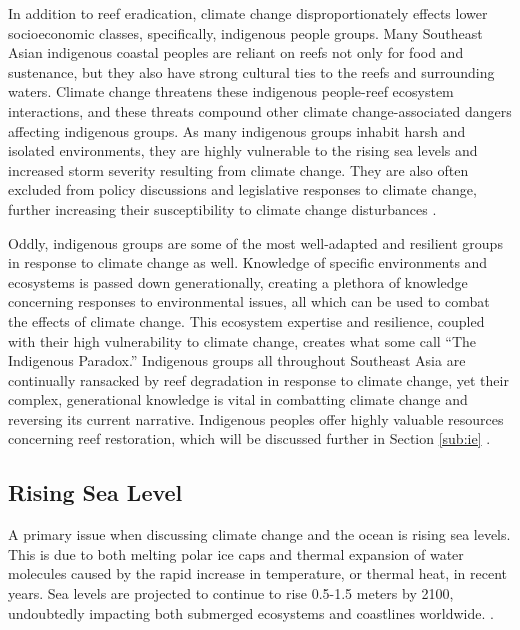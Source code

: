 \documentclass{book}\usepackage{knitr}
\begin{document}
In addition to reef eradication, climate change disproportionately effects lower socioeconomic classes, specifically, indigenous people groups. Many Southeast Asian indigenous coastal peoples are reliant on reefs not only for food and sustenance, but they also have strong cultural ties to the reefs and surrounding waters. Climate change threatens these indigenous people-reef ecosystem interactions, and these threats compound other climate change-associated dangers affecting indigenous groups. As many indigenous groups inhabit harsh and isolated environments, they are highly vulnerable to the rising sea levels and increased storm severity resulting from climate change. They are also often excluded from policy discussions and legislative responses to climate change, further increasing their susceptibility to climate change disturbances \citep{13772149520190801}.

	Oddly, indigenous groups are some of the most well-adapted and resilient groups in response to climate change as well. Knowledge of specific environments and ecosystems is passed down generationally, creating a plethora of knowledge concerning responses to environmental issues, all which can be used to combat the effects of climate change. This ecosystem expertise and resilience, coupled with their high vulnerability to climate change, creates what some call ``The Indigenous Paradox.'' Indigenous groups all throughout Southeast Asia are continually ransacked by reef degradation in response to climate change, yet their complex, generational knowledge is vital in combatting climate change and reversing its current narrative. Indigenous peoples offer highly valuable resources concerning reef restoration, which will be discussed further in Section \ref{sub:ie} \citep{13772149520190801}.

\subsection{Rising Sea Level}

A primary issue when discussing climate change and the ocean is rising sea levels. This is due to both melting polar ice caps and thermal expansion of water molecules caused by the rapid increase in temperature, or thermal heat, in recent years. Sea levels are projected to continue to rise 0.5-1.5 meters by 2100, undoubtedly impacting both submerged ecosystems and coastlines worldwide. \citep{coralreefalliance_2021}.
\end{document}
